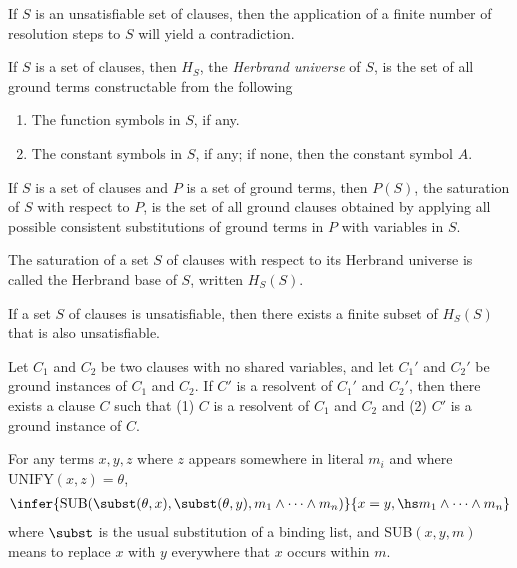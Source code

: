 \documentclass{article}
\begin{document}
\begin{theorem}
    If $S$ is an unsatisfiable set of clauses, then the application of a finite number of
    resolution steps to $S$ will yield a contradiction.
\end{theorem}

\begin{definition}
    If $S$ is a set of clauses, then $H_S$, the \emph{Herbrand universe} of $S$, is 
    the set of all ground terms constructable from the following
    \begin{enumerate}
        \item The function symbols in $S$, if any.
        \item The constant symbols in $S$, if any; if none, then the constant symbol $A$.
    \end{enumerate}
\end{definition}

\begin{definition}[Saturation]
    If $S$ is a set of clauses and $P$ is a set of ground terms, then $P(S)$, the
    saturation of $S$ with respect to $P$, is the set of all ground clauses obtained
    by applying all possible consistent substitutions of ground terms in $P$ with variables in $S$.
\end{definition}

\begin{definition}
    The saturation of a set $S$ of clauses with respect to its Herbrand universe is called the Herbrand
    base of $S$, written $H_S(S)$. 
\end{definition}

\begin{theorem}
    If a set $S$ of clauses is unsatisfiable, then there exists a finite subset of $H_S(S)$
    that is also unsatisfiable. 
\end{theorem}

\begin{lemma}
    Let $C_1$ and $C_2$ be two clauses with no shared variables,
    and let $C_1'$ and $C_2'$ be ground instances of $C_1$ and $C_2$.
    If $C'$ is a resolvent of $C_1'$ and $C_2'$, then there exists a clause
    $C$ such that (1) $C$ is a resolvent of $C_1$ and $C_2$ and (2) $C'$ is a
    ground instance of $C$. 
\end{lemma}

\begin{definition}[Demodulation]
    For any terms $x,y,z$ where $z$ appears somewhere in literal $m_i$ and where
    $\text{UNIFY}(x,z)=\theta$,
    \begin{align*}
        \infer{
            \text{SUB}(\subst(\theta,x),\subst(\theta,y),m_1\wedge\cdots\wedge m_n)
        }{
            x=y,\hs m_1\wedge\cdots\wedge m_n
        }
    \end{align*}
    where $\subst$ is the usual substitution of a binding list, and SUB$(x,y,m)$
    means to replace $x$ with $y$ everywhere that $x$ occurs within $m$.
\end{definition}
\end{document}
